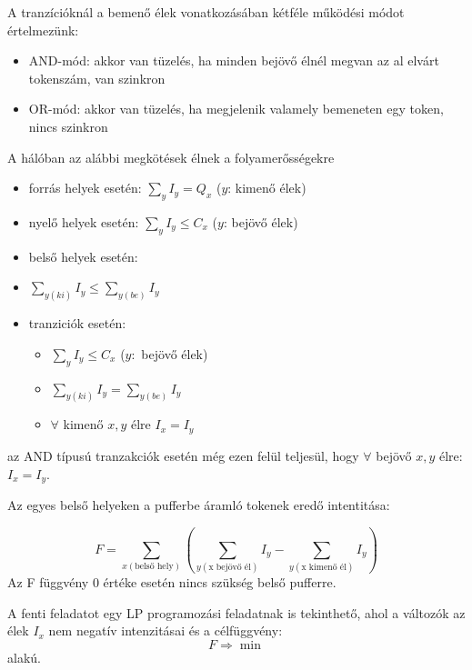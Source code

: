 \documentclass[12pt,a4paper]{book}
\begin{document}
A tranzícióknál a bemenő élek vonatkozásában kétféle működési módot értelmezünk:
\begin{itemize}
\item AND-mód: akkor van tüzelés, ha minden bejövő élnél megvan az al elvárt tokenszám, van szinkron
\item OR-mód: akkor van tüzelés, ha megjelenik valamely bemeneten egy token, nincs szinkron  
\end{itemize}
A hálóban az alábbi megkötések élnek a folyamerősségekre
\begin{itemize}
\item forrás helyek esetén: $\sum_y I_y=Q_x$ ($y$: kimenő élek)
\item nyelő helyek esetén: $\sum_y I_y \leq C_x$ ($y$: bejövő élek)
\item belső helyek esetén: 
\item$\sum_{y(ki)} I_y\leq \sum_{y(be)} I_y$
\item tranziciók esetén: 
\begin{itemize}
\item $\sum_y I_y\leq C_x$ ($y:$ bejövő élek)
\item $\sum_{y(ki)} I_y = \sum_{y(be)} I_y$
\item $\forall$ kimenő $x,y$ élre $I_x=I_y$
\end{itemize}
\end{itemize}
az AND típusú tranzakciók esetén még ezen felül teljesül, hogy $\forall$ bejövő $x,y$ élre:\\
$I_x = I_y$.

Az egyes belső helyeken a pufferbe áramló tokenek  eredő intentitása:

$$F= \sum_{x(\text{belső hely})} \left( \sum_{y(\text{x bejövő él})} I_y - \sum_{y(\text{x kimenő él})} I_y \right)$$
Az F függvény 0 értéke esetén nincs szükség belső pufferre.

A fenti feladatot egy LP programozási feladatnak is tekinthető, ahol a változók az élek $I_x$ nem negatív intenzitásai és a célfüggvény:
$$F\Rightarrow \min$$ alakú.
\end{document}

